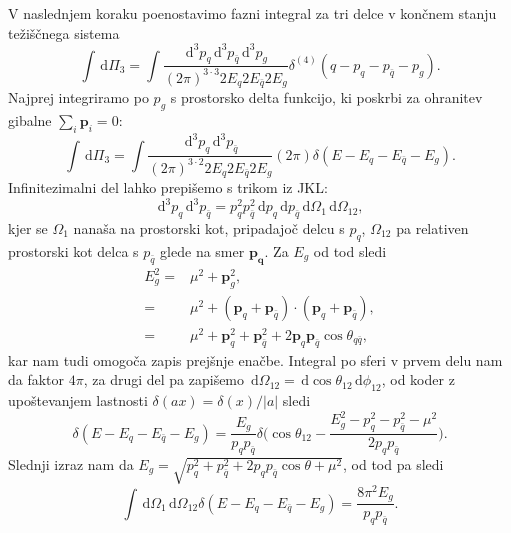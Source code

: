 \documentclass[11pt]{article}
\newcommand{\dd}{\,\mathrm{d}}
\newcommand{\bec}[1]{\mathbf{#1}}
\begin{document}
V naslednjem koraku poenostavimo fazni integral za tri delce v končnem stanju težiščnega sistema
\begin{equation}
       \int \dd \Pi_3 = \int \frac{\dd^3p_q \dd^3p_{\bar{q}} \dd^3p_g}{(2\pi)^{3\cdot 3} 2E_q 2E_{\bar{q}} 2E_g}
       \delta^{(4)}(q - p_q - p_{\bar{q}} - p_g).
\end{equation}
Najprej integriramo po $p_g$ s prostorsko delta funkcijo, ki poskrbi za ohranitev gibalne $\sum_i \bec{p}_i = 0$:
\begin{equation}
       \int \dd \Pi_3 = \int \frac{\dd^3p_q \dd^3p_{\bar{q}}}{(2\pi)^{3\cdot 2} 2E_q 2E_{\bar{q}} 2E_g}
       (2 \pi) \delta(E - E_q - E_{\bar{q}} - E_g).
\end{equation}
Infinitezimalni del lahko prepišemo s trikom iz JKL:
\begin{equation}
       \dd^3p_q \dd^3p_{\bar{q}} = p_q^2 p_{\bar{q}}^2  \dd p_q \dd p_{\bar{q}} \dd \Omega_1 \dd \Omega_{12},
\end{equation}
kjer se $\Omega_1$ nanaša na prostorski kot, pripadajoč delcu s $p_q$, $\Omega_{12}$
pa relativen prostorski kot delca s $p_{\bar{q}}$ glede na smer $\bec{p_q}$.
Za $E_g$ od tod sledi
\begin{equation}
       \begin{split}
              E_g^2 =& \mu^2 + \bec{p}_g^2, \\
                     =&  \mu^2 + (\bec{p}_q + \bec{p}_{\bar{q}}) \cdot (\bec{p}_q + \bec{p}_{\bar{q}}), \\
                     =& \mu^2 + \bec{p}_q^2 + \bec{p}_{\bar{q}}^2 + 2  \bec{p}_q  \bec{p}_{\bar{q}} \cos \theta_{q \bar{q}},
       \end{split}
\end{equation}
kar nam tudi omogoča zapis prejšnje enačbe.
Integral po sferi v prvem delu nam da faktor $4 \pi$, za drugi del pa zapišemo
$\dd \Omega_{12} = \dd \cos \theta_{12} \dd \phi_{12}$, od koder z 
upoštevanjem lastnosti $\delta (a x) = \delta (x) / |a|$ sledi
\begin{equation}
       \delta (E - E_q - E_{\bar{q}} - E_g) = \frac{E_g}{p_q p_{\bar{q}}} \delta 
       \Big (\cos \theta_{12} - \frac{E_g^2 - p_q^2 - p_{\bar{q}}^2 - \mu^2}{2p_q p_{\bar{q}}} \Big).
\end{equation}
Slednji izraz nam da $E_g = \sqrt{p_q^2 + p_{\bar{q}}^2 + 2p_q p_{\bar{q}} \cos \theta + \mu^2}$,
od tod pa sledi
\begin{equation}
       \int \dd \Omega_1 \dd \Omega_{12} \delta (E - E_q - E_{\bar{q}} - E_g) = \frac{8 \pi^2 E_g}{p_q p_{\bar{q}}}.
\end{equation}
\end{document}
